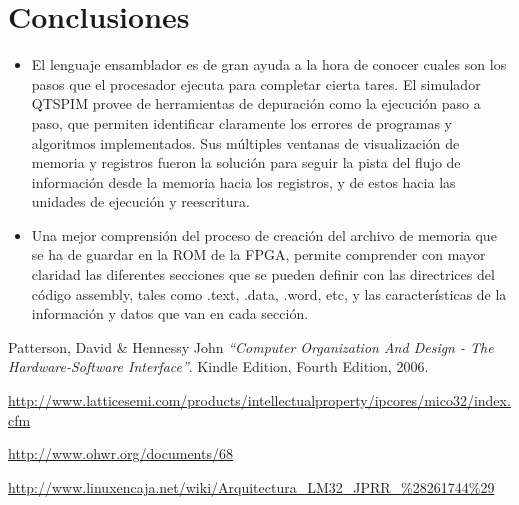 \documentclass[twocolumn]{IEEEtran}
\begin{document}
\section{Conclusiones}
\begin{itemize}
 \item  El lenguaje ensamblador es de gran ayuda a la hora de conocer cuales son los pasos que el procesador ejecuta para completar cierta tares. El simulador QTSPIM provee de herramientas de depuración como la ejecución paso a paso, que permiten identificar claramente los errores de programas y algoritmos implementados. Sus múltiples ventanas de visualización de memoria y registros fueron la solución para seguir la pista del flujo de información desde la memoria hacia los registros, y de estos hacia las unidades de ejecución y reescritura.
 \item Una mejor comprensión del proceso de creación del archivo de memoria que se ha de guardar en la ROM de la FPGA, permite comprender con mayor claridad las diferentes secciones que se pueden definir con las directrices del código assembly, tales como .text, .data, .word, etc, y las características de la información y datos que van en cada sección.
\end{itemize}


\begin{thebibliography}{99}
 Patterson, David \& Hennessy John
{\em "`Computer Organization And Design - The Hardware-Software Interface"'}.
Kindle Edition, Fourth Edition, 2006.

 \url{http://www.latticesemi.com/products/intellectualproperty/ipcores/mico32/index.cfm}

 \url{http://www.ohwr.org/documents/68}

 \url{http://www.linuxencaja.net/wiki/Arquitectura_LM32_JPRR_%28261744%29}
\end{thebibliography}
\end{document}

